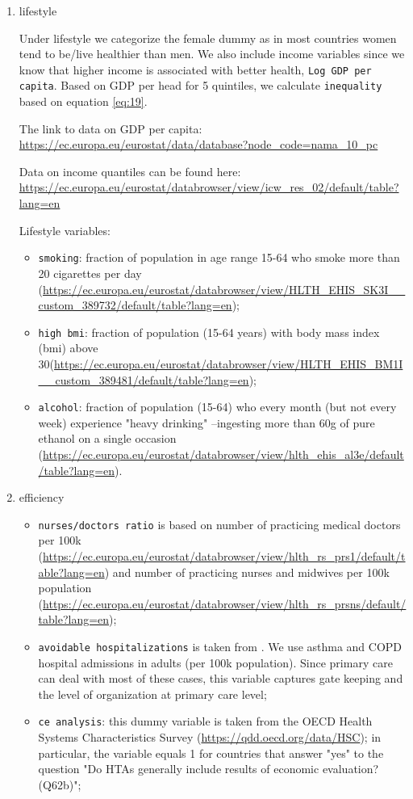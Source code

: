 \documentclass{article}
\begin{document}
\begin{enumerate}
\item lifestyle
\label{sec:orgf3448af}

Under lifestyle we categorize the female dummy as in most countries women tend to be/live healthier than men. We also include income variables since we know that higher income is associated with better health, \texttt{Log GDP per capita}. Based on GDP per head for 5 quintiles, we calculate \texttt{inequality} based on equation \eqref{eq:19}.

The link to data on GDP per capita:
\url{https://ec.europa.eu/eurostat/data/database?node\_code=nama\_10\_pc}

Data on income quantiles can be found here:
\url{https://ec.europa.eu/eurostat/databrowser/view/icw\_res\_02/default/table?lang=en}

Lifestyle variables:
\begin{itemize}
\item \texttt{smoking}: fraction of population in age range 15-64 who smoke more than 20 cigarettes per day (\url{https://ec.europa.eu/eurostat/databrowser/view/HLTH\_EHIS\_SK3I\_\_custom\_389732/default/table?lang=en});
\item \texttt{high bmi}: fraction of population (15-64 years) with body mass index (bmi) above 30(\url{https://ec.europa.eu/eurostat/databrowser/view/HLTH\_EHIS\_BM1I\_\_custom\_389481/default/table?lang=en});
\item \texttt{alcohol}: fraction of population (15-64) who every month (but not every week) experience "heavy drinking" --ingesting more than 60g of pure ethanol on a single occasion (\url{https://ec.europa.eu/eurostat/databrowser/view/hlth\_ehis\_al3e/default/table?lang=en}).
\end{itemize}

\item efficiency
\label{sec:orga6af16e}

\begin{itemize}
\item \texttt{nurses/doctors ratio} is based on number of practicing medical doctors per 100k (\url{https://ec.europa.eu/eurostat/databrowser/view/hlth\_rs\_prs1/default/table?lang=en}) and number of practicing nurses and midwives per 100k population (\url{https://ec.europa.eu/eurostat/databrowser/view/hlth\_rs\_prsns/default/table?lang=en});
\item \texttt{avoidable hospitalizations} is taken from \cite{oecdHospitalAdmissions}. We use asthma and COPD hospital admissions in adults (per 100k population). Since primary care can deal with most of these cases, this variable captures gate keeping and the level of organization at primary care level;
\item \texttt{ce analysis}: this dummy variable is taken from the OECD Health Systems Characteristics Survey (\url{https://qdd.oecd.org/data/HSC});  in particular, the variable equals 1 for countries that answer "yes" to the question "Do HTAs generally include results of economic evaluation? (Q62b)";
\end{itemize}


\end{enumerate}
\end{document}

